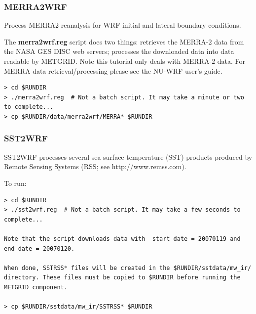 \begin{frame}[fragile]\frametitle{MERRA2WRF}

\footnotesize{Process MERRA2 reanalysis for WRF initial and lateral boundary conditions}.\\
\hrulefill\par
\footnotesize{
The \textbf{merra2wrf.reg} script does two things: retrieves the MERRA-2 data from the NASA GES DISC web servers; processes the downloaded data into data readable by METGRID. Note this tutorial only deals with MERRA-2 data. For MERRA data retrieval/processing please see the NU-WRF user's guide.}\\
\hrulefill\par
\begin{lstlisting}
> cd $RUNDIR
> ./merra2wrf.reg  # Not a batch script. It may take a minute or two to complete...
> cp $RUNDIR/data/merra2wrf/MERRA* $RUNDIR
\end{lstlisting}

\end{frame}

\begin{frame}[fragile]
\frametitle{SST2WRF}

\footnotesize{
SST2WRF processes several sea surface temperature (SST) products produced by Remote Sensing Systems (RSS; see http://www.remss.com).\\
}    
\hrulefill\par
\footnotesize{To run:}
\begin{lstlisting}
> cd $RUNDIR
> ./sst2wrf.reg  # Not a batch script. It may take a few seconds to complete...

Note that the script downloads data with  start date = 20070119 and end date = 20070120.

When done, SSTRSS* files will be created in the $RUNDIR/sstdata/mw_ir/ directory. These files must be copied to $RUNDIR before running the METGRID component. 

> cp $RUNDIR/sstdata/mw_ir/SSTRSS* $RUNDIR
\end{lstlisting}

\end{frame}

